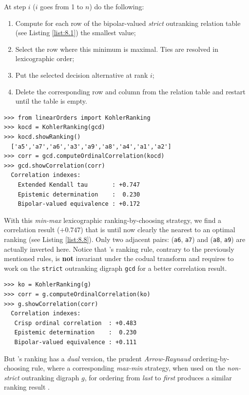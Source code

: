 \begin{definition}
  
\noindent At step $i$ ($i$ goes from 1 to $n$) do the following:
\begin{enumerate}
\item Compute for each row of the bipolar-valued \emph{strict} outranking relation table (see Listing \ref{list:8.1}) the smallest value;
\item Select the row where this minimum is maximal. Ties are resolved in lexicographic order;
\item Put the selected decision alternative at rank $i$;
\item Delete the corresponding row and column from the relation table and restart until the table is empty.
\end{enumerate}
\end{definition}
\begin{lstlisting}[caption={Computing a \Kohler ranking},label=list:8.13]   
>>> from linearOrders import KohlerRanking
>>> kocd = KohlerRanking(gcd)
>>> kocd.showRanking()
  ['a5','a7','a6','a3','a9','a8','a4','a1','a2']
>>> corr = gcd.computeOrdinalCorrelation(kocd)
>>> gcd.showCorrelation(corr)
  Correlation indexes:
    Extended Kendall tau       : +0.747
    Epistemic determination    :  0.230
    Bipolar-valued equivalence : +0.172
\end{lstlisting}

With this \emph{min-max} lexicographic ranking-by-choosing strategy, we find a correlation result ($+0.747$) that is until now clearly the nearest to an optimal \Kemeny ranking (see Listing \ref{list:8.8}). Only two adjacent pairs: (\texttt{a6}, \texttt{a7}) and (\texttt{a8}, \texttt{a9}) are actually inverted here. Notice that \Kohler 's ranking rule, contrary to the previously mentioned rules, is \textbf{not} invariant under the codual transform and requires to work on the \texttt{strict} outranking digraph \texttt{gcd} for a better correlation result.
\begin{lstlisting}
>>> ko = KohlerRanking(g)  
>>> corr = g.computeOrdinalCorrelation(ko)
>>> g.showCorrelation(corr)
  Correlation indexes:
   Crisp ordinal correlation  : +0.483
   Epistemic determination    :  0.230
   Bipolar-valued equivalence : +0.111
\end{lstlisting}

But \Kohler 's ranking has a \emph{dual} version, the prudent \emph{Arrow-Raynaud} ordering-by-choosing rule, where a corresponding \emph{max-min} strategy, when used on the \emph{non-strict} outranking digraph $g$, for ordering from \emph{last} to \emph{first} produces a similar ranking result \citep{ARR-1986}.

